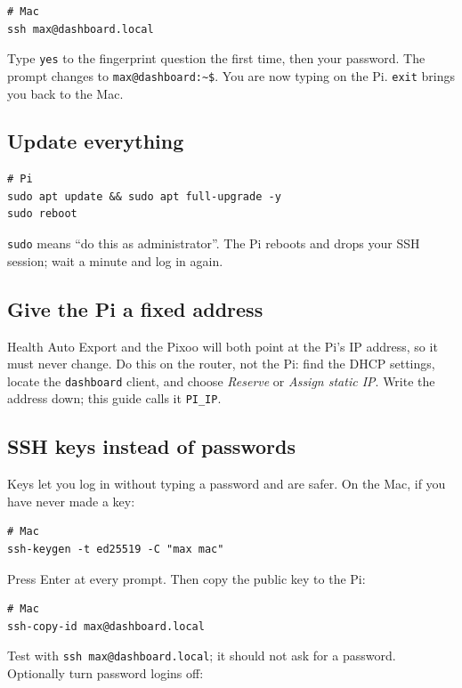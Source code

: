\documentclass[11pt,letterpaper]{article}
\newcommand{\cmd}[1]{\texttt{#1}}
\begin{document}
\begin{lstlisting}
# Mac
ssh max@dashboard.local
\end{lstlisting}

Type \cmd{yes} to the fingerprint question the first time, then your password. The prompt changes to \cmd{max@dashboard:\textasciitilde \$}. You are now typing on the Pi. \cmd{exit} brings you back to the Mac.

\subsection{Update everything}

\begin{lstlisting}
# Pi
sudo apt update && sudo apt full-upgrade -y
sudo reboot
\end{lstlisting}

\cmd{sudo} means ``do this as administrator''. The Pi reboots and drops your SSH session; wait a minute and log in again.

\subsection{Give the Pi a fixed address}

Health Auto Export and the Pixoo will both point at the Pi's IP address, so it must never change. Do this on the router, not the Pi: find the DHCP settings, locate the \cmd{dashboard} client, and choose \emph{Reserve} or \emph{Assign static IP}. Write the address down; this guide calls it \cmd{PI\_IP}.

\subsection{SSH keys instead of passwords}
\label{sec:keys}

Keys let you log in without typing a password and are safer. On the Mac, if you have never made a key:

\begin{lstlisting}
# Mac
ssh-keygen -t ed25519 -C "max mac"
\end{lstlisting}

Press Enter at every prompt. Then copy the public key to the Pi:

\begin{lstlisting}
# Mac
ssh-copy-id max@dashboard.local
\end{lstlisting}

Test with \cmd{ssh max@dashboard.local}; it should not ask for a password. Optionally turn password logins off:
\end{document}
